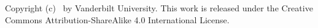 Copyright (c) \the\year\ by Vanderbilt University. This work is released under
the Creative Commons Attribution-ShareAlike 4.0 International License.
%
